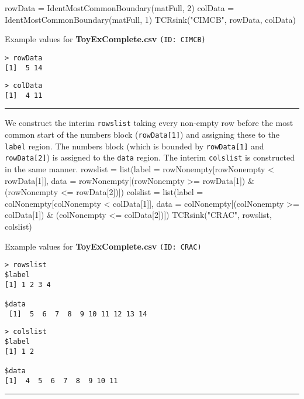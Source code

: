 \documentclass[a4paper]{article}
\begin{document}
\nwenddocs{}\endmoddef
rowData = IdentMostCommonBoundary(matFull, 2)
colData = IdentMostCommonBoundary(matFull, 1)
TCRsink("CIMCB", rowData, colData)
\nwendcode{}\nwdocspar

Example values for \textbf{ToyExComplete.csv} \texttt{(ID: CIMCB)}
\begin{verbatim}
> rowData
[1]  5 14
\end{verbatim}
\begin{verbatim}
> colData
[1]  4 11
\end{verbatim}
\vspace{-1.5em}
\noindent\rule{0.25\textwidth}{0.4pt}
\vspace{0.5em}

We construct the interim \verb|rowslist| taking every non-empty row
before the most common start of the numbers block (\verb|rowData[1]|)
and assigning these to the \verb|label| region. The numbers block
(which is bounded by \verb|rowData[1]| and \verb|rowData[2]|) is
assigned to the \verb|data| region. The interim \verb|colslist| is
constructed in the same manner.
\nwenddocs{}\endmoddef
rowslist = list(label = rowNonempty[rowNonempty < rowData[1]],
                data = rowNonempty[(rowNonempty >= rowData[1]) &
                                   (rowNonempty <= rowData[2])])
colslist = list(label = colNonempty[colNonempty < colData[1]],
                data = colNonempty[(colNonempty >= colData[1]) &
                                   (colNonempty <= colData[2])])
TCRsink("CRAC", rowslist, colslist)
\nwendcode{}\nwdocspar

Example values for \textbf{ToyExComplete.csv} \texttt{(ID: CRAC)}
\begin{verbatim}
> rowslist
$label
[1] 1 2 3 4

$data
 [1]  5  6  7  8  9 10 11 12 13 14

\end{verbatim}
\begin{verbatim}
> colslist
$label
[1] 1 2

$data
[1]  4  5  6  7  8  9 10 11

\end{verbatim}
\vspace{-1.5em}
\noindent\rule{0.25\textwidth}{0.4pt}
\vspace{0.5em}
\end{document}

